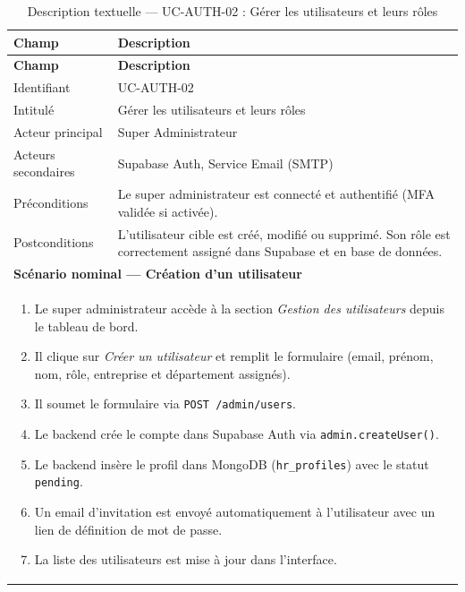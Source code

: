 \renewcommand{\arraystretch}{1.4}
\begin{longtable}{|p{4cm}|p{10cm}|}
\caption{Description textuelle — UC-AUTH-02 : Gérer les utilisateurs et leurs rôles}
\label{tab:uc_auth02} \\
\hline
\rowcolor[HTML]{EFEFEF} \textbf{Champ} & \textbf{Description} \\ \hline
\endfirsthead
\hline
\rowcolor[HTML]{EFEFEF} \textbf{Champ} & \textbf{Description} \\ \hline
\endhead
\hline
\endfoot
\hline
\endlastfoot
Identifiant & UC-AUTH-02 \\ \hline
Intitulé & Gérer les utilisateurs et leurs rôles \\ \hline
Acteur principal & Super Administrateur \\ \hline
Acteurs secondaires & Supabase Auth, Service Email (SMTP) \\ \hline
Préconditions & Le super administrateur est connecté et authentifié (MFA validée si activée). \\ \hline
Postconditions & L'utilisateur cible est créé, modifié ou supprimé. Son rôle est correctement assigné dans Supabase et en base de données. \\ \hline
\multicolumn{2}{|l|}{\textbf{Scénario nominal — Création d'un utilisateur}} \\ \hline
\multicolumn{2}{|p{14.5cm}|}{
\vspace{2pt}
\begin{enumerate}
    \item Le super administrateur accède à la section \textit{Gestion des utilisateurs} depuis le tableau de bord.
    \item Il clique sur \textit{Créer un utilisateur} et remplit le formulaire (email, prénom, nom, rôle, entreprise et département assignés).
    \item Il soumet le formulaire via \texttt{POST /admin/users}.
    \item Le backend crée le compte dans Supabase Auth via \texttt{admin.createUser()}.
    \item Le backend insère le profil dans MongoDB (\texttt{hr\_profiles}) avec le statut \texttt{pending}.
    \item Un email d'invitation est envoyé automatiquement à l'utilisateur avec un lien de définition de mot de passe.
    \item La liste des utilisateurs est mise à jour dans l'interface.
\end{enumerate}
\vspace{2pt}
}
\end{longtable}
